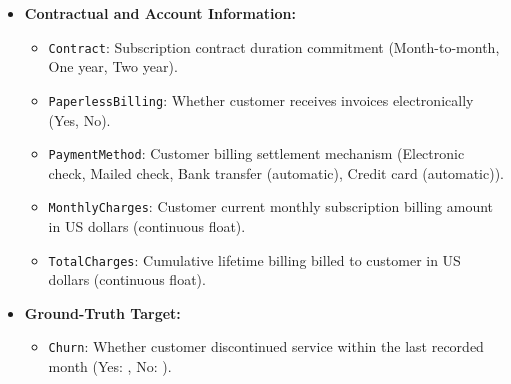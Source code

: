 \begin{itemize}
\begin{itemize}
        \item \texttt{StreamingTV}: Streaming television digital television service (Yes, No, No internet service).
        \item \texttt{StreamingMovies}: Streaming digital cinema and video-on-demand service (Yes, No, No internet service).
    \end{itemize}
    \item \textbf{Contractual and Account Information:}
    \begin{itemize}
        \item \texttt{Contract}: Subscription contract duration commitment (Month-to-month, One year, Two year).
        \item \texttt{PaperlessBilling}: Whether customer receives invoices electronically (Yes, No).
        \item \texttt{PaymentMethod}: Customer billing settlement mechanism (Electronic check, Mailed check, Bank transfer (automatic), Credit card (automatic)).
        \item \texttt{MonthlyCharges}: Customer current monthly subscription billing amount in US dollars (continuous float).
        \item \texttt{TotalCharges}: Cumulative lifetime billing billed to customer in US dollars (continuous float).
    \end{itemize}
    \item \textbf{Ground-Truth Target:}
    \begin{itemize}
        \item \texttt{Churn}: Whether customer discontinued service within the last recorded month (Yes: \datasetChurnProportion{}, No: \datasetRetainedProportion{}).
    \end{itemize}
\end{itemize}

